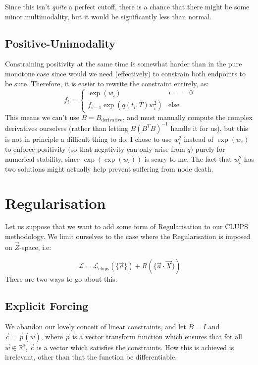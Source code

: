 \documentclass[]{article}
\begin{document}
		Since this isn't \textit{quite} a perfect cutoff, there is a chance that there might be some minor multimodality, but it would be significantly less than normal.

		\subsection{Positive-Unimodality}

			Constraining positivity at the same time is somewhat harder than in the pure monotone case since would we need (effectively) to constrain both endpoints to be sure. Therefore, it is easier to rewrite the constraint entirely, as:
			\begin{equation}
				f_i = \begin{cases} \exp(w_i) & i == 0
					\\
					f_{i-1} \exp(q(t_i,T) w_i^2) & \text{else}
				\end{cases}
			\end{equation} 
			This means we can't use $B = B_\text{derivative}$, and must manually compute the complex derivatives ourselves (rather than letting $B(B^TB)^{-1}$ handle it for us), but this is not in principle a difficult thing to do. I chose to use $w_i^2$ instead of $\exp(w_i)$ to enforce positivity (so that negativity can only arise from $q$) purely for numerical stability, since $\exp(\exp(w_i))$ is scary to me. The fact that $w_i^2$ has two solutions might actually help prevent suffering from node death.

	\section{Regularisation}

		Let us suppose that we want to add some form of Regularisation to our CLUPS methodology. We limit ourselves to the case where the Regularisation is imposed on $\vec{Z}$-space, i.e:

		\begin{equation}
			\mathcal{L} = \mathcal{L}_\text{clups}(\{\vec{a}\}) + R(\{\vec{a}\cdot\vec{X}\}) 
		\end{equation}		
		There are two ways to go about this:
		
		\subsection{Explicit Forcing}
			We abandon our lovely conceit of linear constraints, and let $B = I$ and $\vec{c} = \vec{p}(\vec{w})$, where $\vec{p}$ is a vector transform function which ensures that for all $\vec{w} \in \mathbb{R}^s$, $\vec{c}$ is a vector which satisfies the constraints. How this is achieved is irrelevant, other than that the function be differentiable.
			
\end{document}
